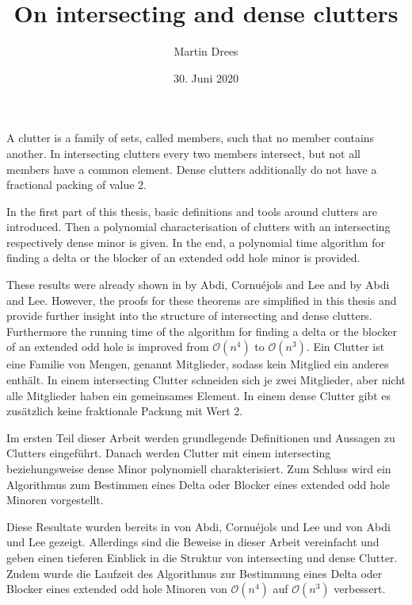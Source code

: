 \documentclass[a4paper, 12pt]{scrbook}
\author{Martin Drees}
\date{30. Juni 2020}
\title{On intersecting and dense clutters}
\theoremstyle{definition}
\begin{document}
\maketitle
{}
A clutter is a family of sets, called members, such that no member contains another.
In intersecting clutters every two members intersect, but not all members have a common element. Dense clutters additionally do not have a fractional packing of value 2.

In the first part of this thesis, basic definitions and tools around clutters are introduced.
Then a polynomial characterisation of clutters with an intersecting respectively dense minor is given.
In the end, a polynomial time algorithm for finding a delta or the blocker of an extended odd hole minor is provided.

These results were already shown in  by Abdi, Cornuéjols and Lee and  by Abdi and Lee.
However, the proofs for these theorems are simplified in this thesis and provide further insight into the structure of intersecting and dense clutters.
Furthermore the running time of the algorithm for finding a delta or the blocker of an extended odd hole is improved from $\mathcal{O}(n^4)$ to $\mathcal{O}(n^3)$.
{\let\cleardoublepage\relax {}}
Ein Clutter ist eine Familie von Mengen, genannt Mitglieder, sodass kein Mitglied ein anderes enthält. In einem intersecting Clutter schneiden sich je zwei Mitglieder, aber nicht alle Mitglieder haben ein gemeinsames Element. In einem dense Clutter gibt es zusätzlich keine fraktionale Packung mit Wert 2.

Im ersten Teil dieser Arbeit werden grundlegende Definitionen und Aussagen zu Clutters eingeführt. Danach werden Clutter mit einem intersecting beziehungsweise dense Minor polynomiell charakterisiert. Zum Schluss wird ein Algorithmus zum Bestimmen eines Delta oder Blocker eines extended odd hole Minoren vorgestellt.

Diese Resultate wurden bereits in  von Abdi, Cornuéjols und Lee und  von Abdi und Lee gezeigt. Allerdings sind die Beweise in dieser Arbeit vereinfacht und geben einen tieferen Einblick in die Struktur von intersecting und dense Clutter. Zudem wurde die Laufzeit des Algorithmus zur Bestimmung eines Delta oder Blocker eines extended odd hole Minoren von $\mathcal{O}(n^4)$ auf $\mathcal{O}(n^3)$ verbessert.
\end{document}
